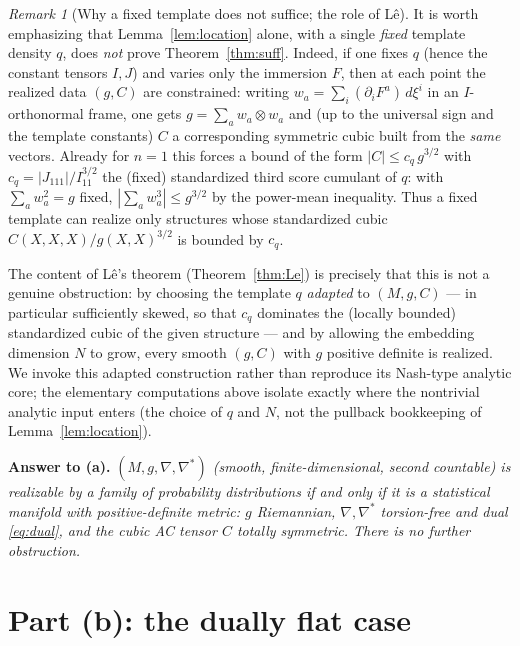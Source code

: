\documentclass{amsart}
\theoremstyle{definition}
\theoremstyle{remark}
\newtheorem{remark}{Remark}
\begin{document}
\begin{remark}[Why a fixed template does not suffice; the role of L\^e]
\label{rem:tunable}
It is worth emphasizing that Lemma~\ref{lem:location} alone, with a single
\emph{fixed} template density $q$, does \emph{not} prove
Theorem~\ref{thm:suff}. Indeed, if one fixes $q$ (hence the constant tensors
$I,J$) and varies only the immersion $F$, then at each point the realized data
$(g,C)$ are constrained: writing $w_{a}=\sum_{i}(\partial_{i}F^{a})\,d\xi^{i}$
in an $I$-orthonormal frame, one gets $g=\sum_{a}w_{a}\otimes w_{a}$ and (up to
the universal sign and the template constants) $C$ a corresponding symmetric
cubic built from the \emph{same} vectors. Already for $n=1$ this forces a bound
of the form $|C|\le c_{q}\,g^{3/2}$ with $c_{q}=|J_{111}|/I_{11}^{3/2}$ the
(fixed) standardized third score cumulant of $q$: with $\sum_{a}w_{a}^{2}=g$
fixed, $|\sum_{a}w_{a}^{3}|\le g^{3/2}$ by the power-mean inequality. Thus a
fixed template can realize only structures whose standardized cubic
$C(X,X,X)/g(X,X)^{3/2}$ is bounded by $c_{q}$.

The content of L\^e's theorem (Theorem~\ref{thm:Le}) is precisely that this is
not a genuine obstruction: by choosing the template $q$ \emph{adapted} to
$(M,g,C)$ --- in particular sufficiently skewed, so that $c_{q}$ dominates the
(locally bounded) standardized cubic of the given structure --- and by allowing
the embedding dimension $N$ to grow, every smooth $(g,C)$ with $g$ positive
definite is realized. We invoke this adapted construction rather than reproduce
its Nash-type analytic core; the elementary computations above isolate exactly
where the nontrivial analytic input enters (the choice of $q$ and $N$, not the
pullback bookkeeping of Lemma~\ref{lem:location}).
\end{remark}

\medskip
\noindent\textbf{Answer to (a).}
\emph{$(M,g,\nabla,\nabla^{*})$ (smooth, finite-dimensional, second countable) is
realizable by a family of probability distributions if and only if it is a
statistical manifold with positive-definite metric: $g$ Riemannian,
$\nabla,\nabla^{*}$ torsion-free and dual \eqref{eq:dual}, and the cubic AC tensor
$C$ totally symmetric. There is no further obstruction.}

\section{Part (b): the dually flat case}
\end{document}
